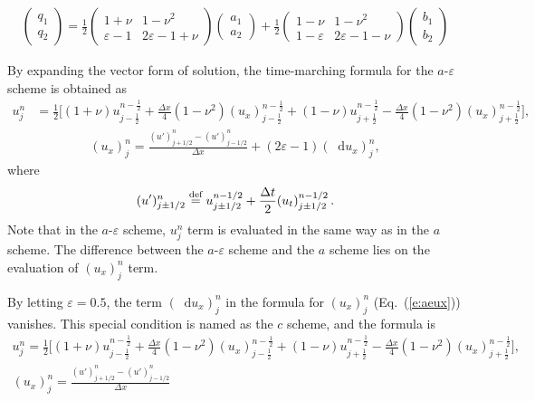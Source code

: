 \documentclass[11pt,dvips]{article}
\numberwithin{equation}{section}
\newcommand{\defeq}{\ensuremath{\buildrel {\text{def}}\over{=}}}
\newcommand{\dif}{\mathop{}\!\mathrm{d}}
\begin{document}
\begin{align*}
  \left(\begin{array}{c} q_1 \\ q_2 \end{array}\right)
    = \frac{1}{2}\left(\begin{array}{cc} 1+\nu & 1-\nu^2 \\
      \varepsilon-1 & 2\varepsilon-1+\nu \end{array}\right)
      \left(\begin{array}{c} a_1 \\ a_2 \end{array}\right)
    + \frac{1}{2}\left(\begin{array}{cc} 1-\nu & 1-\nu^2 \\
      1-\varepsilon & 2\varepsilon - 1 - \nu \end{array}\right)
  \left(\begin{array}{c} b_1 \\ b_2 \end{array}\right)
\end{align*}

By expanding the vector form of solution, the time-marching formula for
the $a$-$\varepsilon$ scheme is obtained as
\begin{align}
  u_j^n &= \frac{1}{2}\Big[
      (1+\nu)u_{j-\frac{1}{2}}^{n-\frac{1}{2}}
    + \frac{\Delta x}{4}(1-\nu^2)(u_x)_{j-\frac{1}{2}}^{n-\frac{1}{2}}
    + (1-\nu)u_{j+\frac{1}{2}}^{n-\frac{1}{2}}
    - \frac{\Delta x}{4}(1-\nu^2)(u_x)_{j+\frac{1}{2}}^{n-\frac{1}{2}}
  \Big], \label{e:aeu}
\end{align}
\begin{align}
  (u_x)_j^n = \frac{(u')_{j+1/2}^n - (u')_{j-1/2}^n}{\Delta x}
            + (2\varepsilon-1)(\dif u_x)_j^n, \label{e:aeux}
\end{align}
where
\begin{align*}
  (u')_{j\pm1/2}^n \defeq
    u_{j\pm1/2}^{n-1/2}+\frac{\Delta t}{2}(u_t)_{j\pm1/2}^{n-1/2}\,.
\end{align*}
Note that in the $a$-$\varepsilon$ scheme, $u_j^n$ term is evaluated in the
same way as in the $a$ scheme.  The difference between the $a$-$\varepsilon$
scheme and the $a$ scheme lies on the evaluation of $(u_x)_j^n$ term.

By letting $\varepsilon=0.5$, the term $(\dif u_x)_j^n$ in the formula for
$(u_x)_j^n$ (Eq.~(\ref{e:aeux})) vanishes.  This special condition is named as
the $c$ scheme, and the formula is
\begin{gather}
  u_j^n = \frac{1}{2}\Big[
      (1+\nu)u_{j-\frac{1}{2}}^{n-\frac{1}{2}}
    + \frac{\Delta x}{4}(1-\nu^2)(u_x)_{j-\frac{1}{2}}^{n-\frac{1}{2}}
    + (1-\nu)u_{j+\frac{1}{2}}^{n-\frac{1}{2}}
    - \frac{\Delta x}{4}(1-\nu^2)(u_x)_{j+\frac{1}{2}}^{n-\frac{1}{2}}
  \Big], \label{e:cu} \\
  (u_x)_j^n = \frac{(u')_{j+1/2}^n - (u')_{j-1/2}^n}{\Delta x}
  \label{e:cux}
\end{gather}
\end{document}
